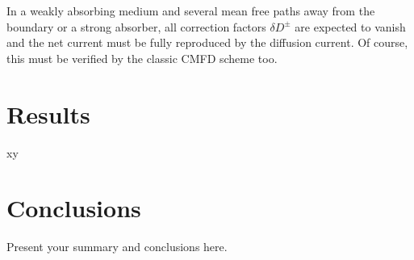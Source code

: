 In a weakly absorbing medium and several mean free paths away from the boundary or a strong absorber, all correction factors $\delta D^\pm$ are expected to vanish and the net current must be fully reproduced by the diffusion current. Of course, this must be verified by the classic CMFD scheme too.

\section{Results}
\label{sec:res}

xy

\section{Conclusions}
\label{sec:conc}

Present your summary and conclusions here.

%
